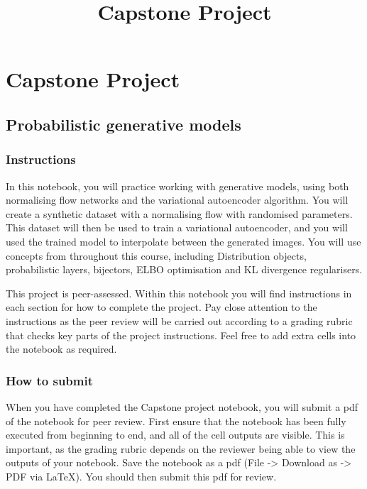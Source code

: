 \documentclass[11pt]{article}
\title{Capstone Project}
\begin{document}
    
    
    \maketitle
    
    

    
    \section{Capstone Project}\label{capstone-project}

\subsection{Probabilistic generative
models}\label{probabilistic-generative-models}

\subsubsection{Instructions}\label{instructions}

In this notebook, you will practice working with generative models,
using both normalising flow networks and the variational autoencoder
algorithm. You will create a synthetic dataset with a normalising flow
with randomised parameters. This dataset will then be used to train a
variational autoencoder, and you will used the trained model to
interpolate between the generated images. You will use concepts from
throughout this course, including Distribution objects, probabilistic
layers, bijectors, ELBO optimisation and KL divergence regularisers.

This project is peer-assessed. Within this notebook you will find
instructions in each section for how to complete the project. Pay close
attention to the instructions as the peer review will be carried out
according to a grading rubric that checks key parts of the project
instructions. Feel free to add extra cells into the notebook as
required.

\subsubsection{How to submit}\label{how-to-submit}

When you have completed the Capstone project notebook, you will submit a
pdf of the notebook for peer review. First ensure that the notebook has
been fully executed from beginning to end, and all of the cell outputs
are visible. This is important, as the grading rubric depends on the
reviewer being able to view the outputs of your notebook. Save the
notebook as a pdf (File -\textgreater{} Download as -\textgreater{} PDF
via LaTeX). You should then submit this pdf for review.
\end{document}
